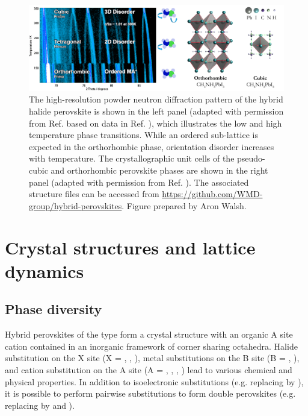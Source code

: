 \begin{figure}
\includegraphics[width=1.0\columnwidth]{./figures/ch2/f1.png}
\caption[ powder neutron diffraction pattern and crystallographic unit cells]{
The high-resolution powder neutron diffraction pattern of the hybrid halide perovskite  is shown in the left panel (adapted with permission from Ref. \autocite{Frost2016a} based on data in Ref. \autocite{Weller2015}), which illustrates the low and high temperature phase transitions. While an ordered  sub-lattice is expected in the orthorhombic phase, orientation disorder increases with temperature. 
The crystallographic unit cells of the pseudo-cubic and orthorhombic perovskite phases are shown in the right panel (adapted with permission from Ref. \autocite{Brivio2015a}). The associated structure files can be accessed from \url{https://github.com/WMD-group/hybrid-perovskites}. Figure prepared by Aron Walsh.
}
\label{fig1}
\end{figure}

\section{Crystal structures and lattice dynamics} 

\subsection{Phase diversity}
Hybrid perovskites of the type  form a crystal structure with an organic A site cation contained in an inorganic  framework of corner sharing octahedra. 
Halide substitution on the X site (X = , , ), metal substitutions on the B site (B = , ), and cation substitution on the A site (A = , , , ) lead to various chemical and physical properties.\autocite{Mitzi2001,Mitzi2004a}
In addition to isoelectronic substitutions (e.g. replacing  by ), it is possible to perform pairwise substitutions to form double perovskites (e.g. replacing  by  and ).\autocite{Savory2016,Volonakis2016}

